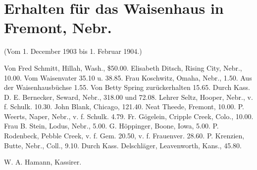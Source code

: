 \chapter[Erhalten für das Waisenhaus in …]{Erhalten für das Waisenhaus in Fremont, Nebr.}

(Vom 1. December 1903 bis 1. Februar 1904.)

Von Fred Schmitt, Hillah, Wash., \$50.00. Elisabeth Ditsch, Rising City, Nebr., 10.00. Vom Waisenvater 35.10 u. 38.85. Frau Koschwitz, Omaha, Nebr., 1.50. Aus der Waisenhausbüchse 1.55. Von Betty Spring zurückerhalten 15.65. Durch Kass. D. E. Bernecker, Seward, Nebr., 318.00 und 72.08. Lehrer Seltz, Hooper, Nebr., v. f. Schulk. 10.30. John Blank, Chicago, 121.40. Neat Theede, Fremont, 10.00. P. Weerts, Naper, Nebr., v. f. Schulk. 4.79. Fr. Gögelein, Cripple Creek, Colo., 10.00. Frau B. Stein, Lodus, Nebr., 5.00. G. Höppinger, Boone, Iowa, 5.00. P. Rodenbeck, Pebble Creek, v. f. Gem. 20.50, v. f. Frauenver. 28.60. P. Krenzien, Butte, Nebr., Coll., 9.10. Durch Kass. Delschläger, Leavenworth, Kans., 45.80.

W. A. Hamann, Kassirer.
